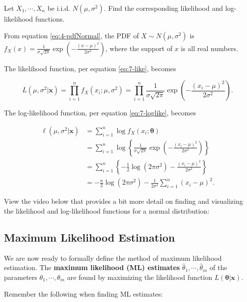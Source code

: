 \documentclass[
]{book}
\begin{document}
Let \(X_1, \cdots, X_n\) be i.i.d. \(N(\mu, \sigma^2)\). Find the corresponding likelihood and log-likelihood functions.

From equation \eqref{eq:4-pdfNormal}, the PDF of \(X \sim N(\mu, \sigma^2)\) is \(f_X(x) = \frac{1}{\sigma \sqrt{2 \pi}} \exp \left(-\frac{(x - \mu)^2}{2 \sigma^2} \right)\), where the support of \(x\) is all real numbers.

The likelihood function, per equation \eqref{eq:7-like}, becomes

\[
L(\mu, \sigma^2 | \boldsymbol{x} ) = \prod_{i=1}^n f_X(x_i; \mu, \sigma^2) = \prod_{i=1}^n \frac{1}{\sigma \sqrt{2 \pi}} \exp \left(-\frac{(x_i - \mu)^2}{2 \sigma^2} \right).
\]

The log-likelihood function, per equation \eqref{eq:7-loglike}, becomes

\[
\begin{split}
\ell (\mu, \sigma^2 | \boldsymbol{x}) &= \sum_{i=1}^n \log f_X(x_i; \boldsymbol{\theta}) \\
                          &= \sum_{i=1}^n \log \left\{ \frac{1}{\sigma \sqrt{2 \pi}} \exp \left(-\frac{(x_i - \mu)^2}{2 \sigma^2} \right) \right\} \\
                          &= \sum_{i=1}^n \left\{-\frac{1}{2} \log (2 \pi \sigma^2) -\frac{(x_i - \mu)^2}{2 \sigma^2} \right\} \\
                          &= -\frac{n}{2} \log (2 \pi \sigma^2) - \frac{1}{2 \sigma^2} \sum_{i=1}^n (x_i - \mu)^2.
\end{split}
\]

View the video below that provides a bit more detail on finding and visualizing the likelihood and log-likelihood functions for a normal distribution:

\hypertarget{maximum-likelihood-estimation}{%
\subsection{Maximum Likelihood Estimation}\label{maximum-likelihood-estimation}}

We are now ready to formally define the method of maximum likelihood estimation. The \textbf{maximum likelihood (ML) estimates} \(\hat{\theta}_1, \cdots, \hat{\theta}_m\) of the parameters \(\theta_1, \cdots, \theta_m\) are found by maximizing the likelihood function \(L(\boldsymbol{\theta} | \boldsymbol{x} )\).

Remember the following when finding ML estimates:
\end{document}
